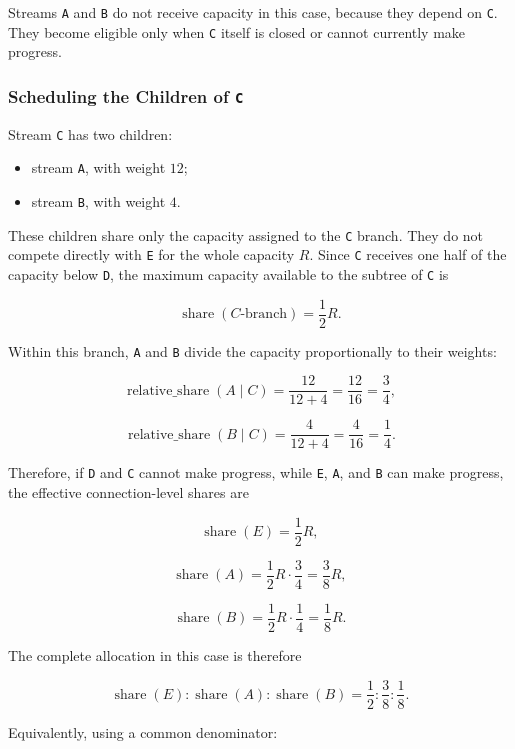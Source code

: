 \documentclass{scrbook}
\begin{document}
Streams \texttt{A} and \texttt{B} do not receive capacity in this case, because they depend on \texttt{C}. They become eligible only when \texttt{C} itself is closed or cannot currently make progress.

\subsubsection{Scheduling the Children of \texttt{C}}

Stream \texttt{C} has two children:

\begin{itemize}
	\item stream \texttt{A}, with weight \(12\);
	\item stream \texttt{B}, with weight \(4\).
\end{itemize}

These children share only the capacity assigned to the \texttt{C} branch. They do not compete directly with \texttt{E} for the whole capacity \(R\). Since \texttt{C} receives one half of the capacity below \texttt{D}, the maximum capacity available to the subtree of \texttt{C} is

\[
\operatorname{share}(C\text{-branch})
=
\frac{1}{2}R.
\]

Within this branch, \texttt{A} and \texttt{B} divide the capacity proportionally to their weights:

\[
\operatorname{relative\_share}(A \mid C)
=
\frac{12}{12+4}
=
\frac{12}{16}
=
\frac{3}{4},
\]

\[
\operatorname{relative\_share}(B \mid C)
=
\frac{4}{12+4}
=
\frac{4}{16}
=
\frac{1}{4}.
\]

Therefore, if \texttt{D} and \texttt{C} cannot make progress, while \texttt{E}, \texttt{A}, and \texttt{B} can make progress, the effective connection-level shares are

\[
\operatorname{share}(E)
=
\frac{1}{2}R,
\]

\[
\operatorname{share}(A)
=
\frac{1}{2}R \cdot \frac{3}{4}
=
\frac{3}{8}R,
\]

\[
\operatorname{share}(B)
=
\frac{1}{2}R \cdot \frac{1}{4}
=
\frac{1}{8}R.
\]

The complete allocation in this case is therefore

\[
\operatorname{share}(E)
:
\operatorname{share}(A)
:
\operatorname{share}(B)
=
\frac{1}{2}
:
\frac{3}{8}
:
\frac{1}{8}.
\]

Equivalently, using a common denominator:
\end{document}
